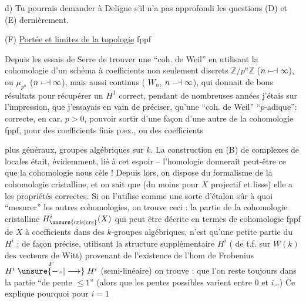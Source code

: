 d) Tu pourrais demander à Deligne s'il n'a pas approfondi les questions (D) et (E) dernièrement.


(F) \uline{Portée et limites de la topologie} fppf

Depuis les essais de Serre de trouver une ``coh. de Weil'' en utilisant la cohomologie d'un schéma à coefficients non seulement discrets $\mathbb Z/p^n\mathbb Z$ ($n\mathrel{\mapstochar\relbar\joinrel\dashv}\infty$), ou $\mu_{p^n}$ ($n\mathrel{\mapstochar\relbar\joinrel\dashv}\infty$), mais aussi continus ( $W_n$, $n\mathrel{\relbar\joinrel\dashv}\infty$), qui donnait de bons résultats pour récupérer un $H^1$ correct, pendant de nombreuses années j'étais  sur l'impression, que j'essayais en vain de préciser, qu'une ``coh. de Weil'' ``$p$-adique'': correcte, en car. $p>0$,  pouvoir sortir d'une façon  d'une autre de la cohomologie fppf, pour des coefficients finis p.ex., ou des coefficients

plus généraux, groupes algébriques sur $k$. La construction en (B) de complexes de  locales était, évidemment,  lié à cet espoir -- l'homologie donnerait peut-être ce que la cohomologie nous cèle ! Depuis lors, on dispose du formalisme de la cohomologie cristalline, et on sait  que (du moins  pour $X$ projectif et lisse) elle a les propriétés correctes. Si on l'utilise comme une sorte d'étalon sûr à quoi ``mesurer'' les autres cohomologies, on trouve ceci : la partie de la cohomologie cristalline $H^i_{\unsure{\mathrm{cris}|\mathrm{crs}}}(X)$ qui peut être décrite en termes de cohomologie fppf de $X$ à coefficients dans des $k$-groupes algébriques, n'est qu'une  petite partie du $H^i$ ; de façon précise, utilisant la structure  supplémentaire  $H^i$ ( de t.f. sur  $W(k)$ des vecteurs de Witt) provenant de l'existence de l'hom de Frobenius $H^i\mathrel{\mathop{\unsure{\relbar\joinrel{\scriptscriptstyle\wedge}|\longrightarrow}}\limits^{F}}H^i$ (semi-linéaire) on trouve : que l'on reste toujours dans la partie ``de pente $\leq 1$'' (alors que les pentes possibles varient entre $0$ et $i$\ldots) Ce explique pourquoi pour $i=1$

